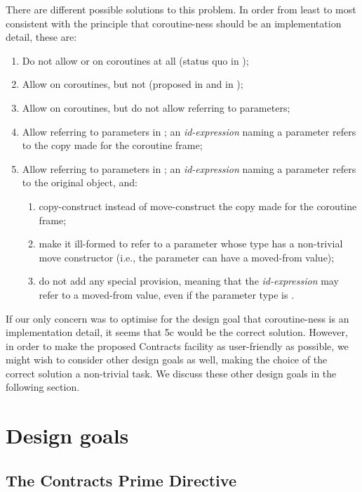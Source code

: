 There are different possible solutions to this problem. In order from least to most consistent with the principle that coroutine-ness should be an implementation detail, these are:
\begin{enumerate}
\item Do not allow  or  on coroutines at all (status quo in \cite{P2900R8});
\item Allow  on coroutines, but not  (proposed in \cite{P2957R1} and in \cite{P3251R0});
\item Allow  on coroutines, but do not allow referring to parameters;
\item Allow referring to parameters in ; an \emph{id-expression} naming a parameter refers to the copy made for the coroutine frame;
\item Allow referring to parameters in ; an \emph{id-expression} naming a parameter refers to the original object, and:
\begin{enumerate}[label=\alph*.,ref=\theenumi\alph*]
        \item copy-construct instead of move-construct the copy made for the coroutine frame;
        \item make it ill-formed to refer to a parameter whose type has a non-trivial move constructor (i.e., the parameter can have a moved-from value);
        \item do not add any special provision, meaning that the \emph{id-expression} may refer to a moved-from value, even if the parameter type is .
\end{enumerate}
\end{enumerate}

If our only concern was to optimise for the design goal that coroutine-ness is an implementation detail, it seems that 5c would be the correct solution. However, in order to make the proposed Contracts facility as user-friendly as possible, we might wish to consider other design goals as well, making the choice of the correct solution a non-trivial task. We discuss these other design goals in the following section.

\section{Design goals}

\subsection{The Contracts Prime Directive}

